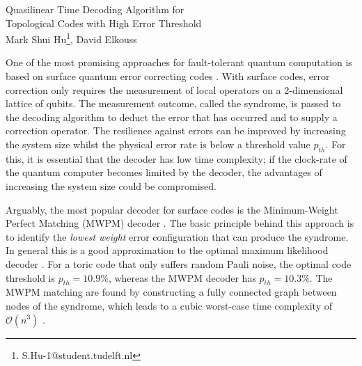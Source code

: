 \documentclass[11pt, a4paper, twoside, titlepage ,dvipsnames]{report}
\begin{document}
\begingroup
    \centering
    \Large Quasilinear Time Decoding Algorithm for \\Topological Codes with High Error Threshold\\[.5em]
    \large Mark Shui Hu\footnote{S.Hu-1@student.tudelft.nl}, David Elkouss\par
\endgroup
\vspace{2em}
One of the most promising approaches for fault-tolerant quantum computation is based on surface quantum error correcting codes \cite{dennis2002topological, kitaev2003fault}. With surface codes, error correction only requires the measurement of local operators on a 2-dimensional lattice of qubits. The measurement outcome, called the syndrome, is passed to the decoding algorithm to deduct the error that has occurred and to supply a correction operator. 
The resilience against errors can be improved by increasing the system size whilst the physical error rate is below a threshold value $p_{th}$. For this, it is essential that the decoder has low time complexity; if the clock-rate of the quantum computer becomes limited by the decoder, the advantages of increasing the system size could be compromised.

Arguably, the most popular decoder for surface codes is the Minimum-Weight Perfect Matching (MWPM) decoder \cite{dennis2002topological}. The basic principle behind this approach is to identify the \emph{lowest weight} error configuration that can produce the syndrome. In general this is a good approximation to the optimal maximum likelihood decoder \cite{bravyi2014efficient}. For a toric code that only suffers random Pauli noise, the optimal code threshold is $p_{th} = 10.9\%$, whereas the MWPM decoder has $p_{th} = 10.3\%$. The MWPM matching are found by constructing a fully connected graph between nodes of the syndrome, which leads to a cubic worst-case time complexity of $\mathcal{O}(n^3)$ \cite{kolmogorov2009blossom}.
\end{document}
